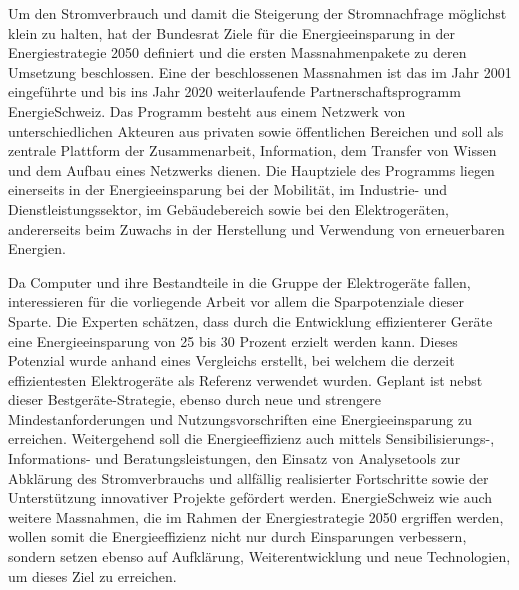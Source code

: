 Um den Stromverbrauch und damit die Steigerung der Stromnachfrage möglichst klein zu halten, hat der Bundesrat Ziele für die Energieeinsparung in der Energiestrategie 2050 definiert und die ersten Massnahmenpakete zu deren Umsetzung beschlossen. Eine der beschlossenen Massnahmen ist das im Jahr 2001 eingeführte und bis ins Jahr 2020 weiterlaufende Partnerschaftsprogramm EnergieSchweiz. Das Programm besteht aus einem Netzwerk von unterschiedlichen Akteuren aus privaten sowie öffentlichen Bereichen und soll als zentrale Plattform der Zusammenarbeit, Information, dem Transfer von Wissen und dem Aufbau eines Netzwerks dienen. Die Hauptziele des Programms liegen einerseits in der Energieeinsparung bei der Mobilität, im Industrie- und Dienstleistungssektor, im Gebäudebereich sowie bei den Elektrogeräten, andererseits beim Zuwachs in der Herstellung und Verwendung von erneuerbaren Energien. 
\par
Da Computer und ihre Bestandteile in die Gruppe der Elektrogeräte fallen, interessieren für die vorliegende Arbeit vor allem die Sparpotenziale dieser Sparte. Die Experten schätzen, dass durch die Entwicklung effizienterer Geräte eine Energieeinsparung von 25 bis 30 Prozent erzielt werden kann. Dieses Potenzial wurde anhand eines Vergleichs erstellt, bei welchem die derzeit effizientesten Elektrogeräte als Referenz verwendet wurden. Geplant ist nebst dieser Bestgeräte-Strategie, ebenso durch neue und strengere Mindestanforderungen und Nutzungsvorschriften eine Energieeinsparung zu erreichen. Weitergehend soll die Energieeffizienz auch mittels Sensibilisierungs-, Informations- und Beratungsleistungen, den Einsatz von Analysetools zur Abklärung des Stromverbrauchs und allfällig realisierter Fortschritte sowie der Unterstützung innovativer Projekte gefördert werden. EnergieSchweiz wie auch weitere Massnahmen, die im Rahmen der Energiestrategie 2050 ergriffen werden, wollen somit die Energieeffizienz nicht nur durch Einsparungen verbessern, sondern setzen ebenso auf Aufklärung, Weiterentwicklung und neue Technologien, um dieses Ziel zu erreichen.







